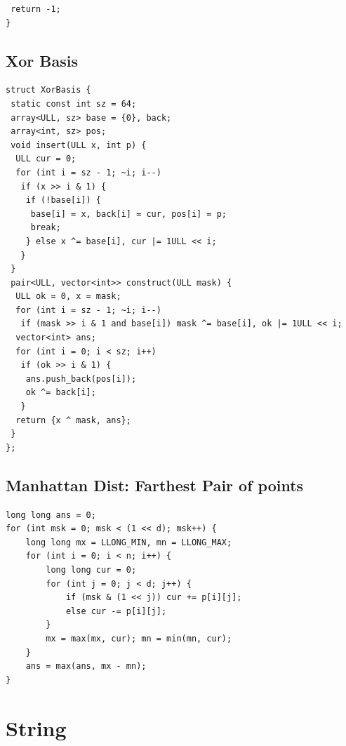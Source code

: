 \documentclass[a4paper,11pt,oneside]{article}
\begin{document}
\begin{multicols*}{\COLS}
\begin{lstlisting}
 return -1;
}
\end{lstlisting}
\subsection{Xor Basis}
\begin{lstlisting}
struct XorBasis {
 static const int sz = 64;
 array<ULL, sz> base = {0}, back;
 array<int, sz> pos;
 void insert(ULL x, int p) {
  ULL cur = 0;
  for (int i = sz - 1; ~i; i--)
   if (x >> i & 1) {
    if (!base[i]) {
     base[i] = x, back[i] = cur, pos[i] = p;
     break;
    } else x ^= base[i], cur |= 1ULL << i;
   }
 }
 pair<ULL, vector<int>> construct(ULL mask) {
  ULL ok = 0, x = mask;
  for (int i = sz - 1; ~i; i--)
   if (mask >> i & 1 and base[i]) mask ^= base[i], ok |= 1ULL << i;
  vector<int> ans;
  for (int i = 0; i < sz; i++)
   if (ok >> i & 1) {
    ans.push_back(pos[i]);
    ok ^= back[i];
   }
  return {x ^ mask, ans};
 }
};
\end{lstlisting}
\subsection{Manhattan Dist: Farthest Pair of points}
\begin{lstlisting}
long long ans = 0;
for (int msk = 0; msk < (1 << d); msk++) {
    long long mx = LLONG_MIN, mn = LLONG_MAX;
    for (int i = 0; i < n; i++) {
        long long cur = 0;
        for (int j = 0; j < d; j++) {
            if (msk & (1 << j)) cur += p[i][j];
            else cur -= p[i][j];
        }
        mx = max(mx, cur); mn = min(mn, cur);
    }
    ans = max(ans, mx - mn);
}
\end{lstlisting}
\section{String}

\end{multicols*}
\end{document}
